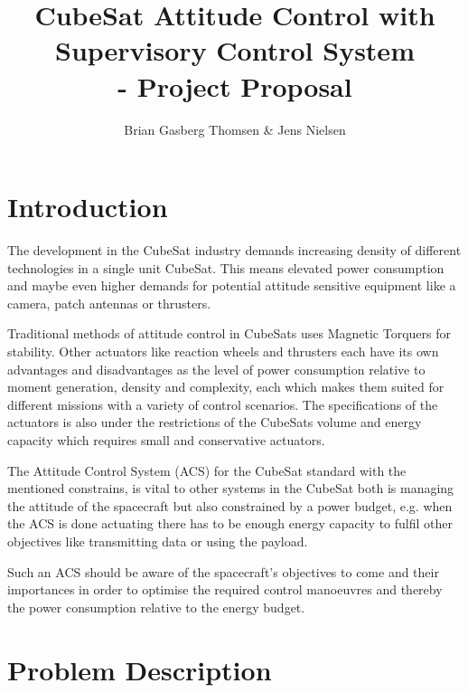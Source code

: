 \documentclass[10pt,a4paper,oneside,openany,article]{memoir}
\title{\vspace{-2cm} CubeSat Attitude Control with Supervisory Control System \\ \Large - Project Proposal}
\author{Brian Gasberg Thomsen \& Jens Nielsen}
\begin{document}
\maketitle

\chapter{Introduction}
The development in the CubeSat industry demands increasing density of different technologies in a single unit CubeSat. This means elevated power consumption and maybe even higher demands for potential attitude sensitive equipment like a camera, patch antennas or thrusters. 

Traditional methods of attitude control in CubeSats uses Magnetic Torquers for stability. Other actuators like reaction wheels and thrusters each have its own advantages and disadvantages as the level of power consumption relative to moment generation, density and complexity, each which makes them suited for different missions with a variety of control scenarios. The specifications of the actuators is also under the restrictions of the CubeSats volume and energy capacity which requires small and conservative actuators.

The Attitude Control System (ACS) for the CubeSat standard with the mentioned constrains, is vital to other systems in the CubeSat both is managing the attitude of the spacecraft but also constrained by a power budget, e.g. when the ACS is done actuating there has to be enough energy capacity to fulfil other objectives like transmitting data or using the payload.

Such an ACS should be aware of the spacecraft's objectives to come and their importances in order to optimise the required control manoeuvres and thereby the power consumption relative to the energy budget.

\chapter{Problem Description}

\end{document}
